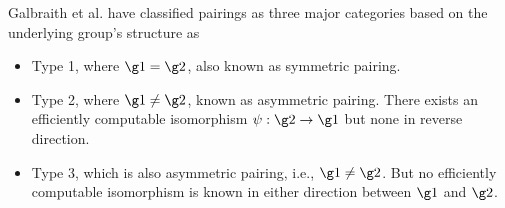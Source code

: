 Galbraith et al. \cite{galbraith2008pairings} have classified pairings as three major categories based on the underlying group's structure as 
\begin{itemize}
	\item Type 1, where $\g1 = \g2$, also known as symmetric pairing. 
	\item Type 2, where $\g1 \neq \g2$, known as asymmetric pairing. There exists an efficiently computable isomorphism $\psi : \g2 \to \g1$ but none in reverse direction.
	\item Type 3, which is also asymmetric pairing, i.e., $\g1 \neq \g2$. But no efficiently computable isomorphism is known in either direction  between $\g1$ and $\g2$.
\end{itemize}




%
